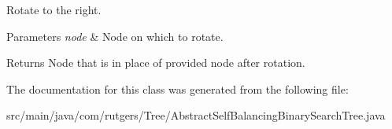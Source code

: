 Rotate to the right.


\begin{DoxyParams}{Parameters}
{\em node} & Node on which to rotate. \\
\hline
\end{DoxyParams}
\begin{DoxyReturn}{Returns}
Node that is in place of provided node after rotation. 
\end{DoxyReturn}


The documentation for this class was generated from the following file\+:\begin{DoxyCompactItemize}
\item 
src/main/java/com/rutgers/\+Tree/Abstract\+Self\+Balancing\+Binary\+Search\+Tree.\+java\end{DoxyCompactItemize}
